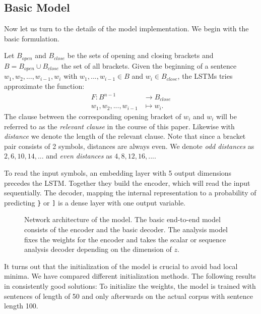 \documentclass[11pt,a4paper]{article}
\begin{document}
\subsection{Basic Model}

Now let us turn to the details of the model implementation.  We begin with the basic formulation.

Let $B_{open}$ and $B_{close}$ be the sets of opening and closing brackets and $B = B_{open} \cup B_{close}$ the set of all brackets. Given the beginning of a sentence $w_1, w_2, ..., w_{i-1}, w_i$ with $w_1, ..., w_{i-1} \in B$ and $w_i \in B_{close}$, the LSTMs tries approximate the function:
%
\begin{align*}
  F \colon B^{n-1} &\to B_{close}\\
  w_1, w_2, ..., w_{i-1} &\mapsto w_i.
  \label{eq:brackets_task_definition}
\end{align*}
%
The clause between the corresponding opening bracket of $w_i$ and $w_i$ will be referred to as the \emph{relevant clause} in the course of this paper. Likewise with \emph{distance} we denote the length of the relevant clause. Note that since a bracket pair consists of 2 symbols, distances are always even. We denote \emph{odd distances} as ${2,6,10,14,...}$ and \emph{even distances} as ${4,8,12,16,...}$.

To read the input symbols, an embedding layer with 5 output dimensions precedes the LSTM. Together they build the encoder, which will read the input sequentially. The decoder, mapping the internal representation to a probability of predicting \verb|}| or \verb|]| is a dense layer with one output variable.

\begin{figure*}[ht]
    \centering
    
    \caption{Network architecture of the model. The basic end-to-end model consists of the encoder and the basic decoder. The analysis model fixes the weights for the encoder and takes the scalar or sequence analysis decoder depending on the dimension of $z$.}
    \label{fig:lstm_architecture}
\end{figure*}

It turns out that the initialization of the model is crucial to avoid bad local minima. We have compared different initialization methods. The following results in consistently good solutions: To initialize the weights, the model is trained with sentences of length of 50 and only afterwards on the actual corpus with sentence length 100.
\end{document}

